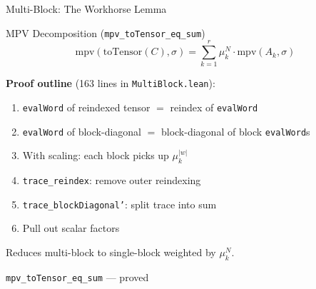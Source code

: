 \documentclass[aspectratio=169,10pt]{beamer}
\begin{document}
\begin{frame}{Multi-Block: The Workhorse Lemma}
\vspace{-0.3em}
\begin{block}{MPV Decomposition (\texttt{mpv\_toTensor\_eq\_sum})}
\vspace{-0.5em}
\begin{equation}
\mathrm{mpv}(\mathrm{toTensor}(C), \sigma) =  \sum_{k=1}^{r} \mu_k^N \cdot \mathrm{mpv}(A_k, \sigma)
\label{eq:decomp}
\end{equation}
\end{block}

\vspace{0.15em}
{\small\textbf{Proof outline} (163 lines in \texttt{MultiBlock.lean}):}
\begin{enumerate}\itemsep0.05em
  \item {\small\texttt{evalWord} of reindexed tensor $=$ reindex of \texttt{evalWord}}
  \item {\small\texttt{evalWord} of block-diagonal $=$ block-diagonal of block \texttt{evalWord}s}
  \item {\small With scaling: each block picks up $\mu_k^{|w|}$}
  \item {\small\texttt{trace\_reindex}: remove outer reindexing}
  \item {\small\texttt{trace\_blockDiagonal'}: split trace into sum}
  \item {\small Pull out scalar factors}
\end{enumerate}

\vspace{0.1em}
{\small Reduces multi-block to single-block weighted by $\mu_k^N$.}

\vspace{0.1em}
{\small\textcolor{leangreen}{\checkmark}  \texttt{mpv\_toTensor\_eq\_sum} --- proved}
\end{frame}
\end{document}
